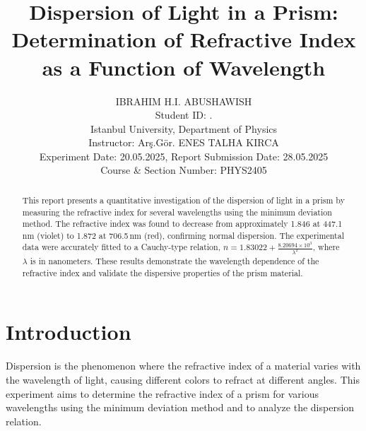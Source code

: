 \documentclass[journal]{IEEEtran}
\begin{document}
\title{Dispersion of Light in a Prism: Determination of Refractive Index as a Function of Wavelength}
\author{IBRAHIM H.I. ABUSHAWISH \\

{\small Student ID: \hspace{1.5cm}. \\ 
Istanbul University, Department of Physics \\
Instructor: Arş.Gör. ENES TALHA KIRCA\\
Experiment Date: 20.05.2025, Report Submission Date: 28.05.2025 \\
Course \& Section Number: PHYS2405}}


\maketitle
\begin{abstract}
    This report presents a quantitative investigation of the dispersion of light in a prism by measuring the refractive index for several wavelengths using the minimum deviation method. The refractive index was found to decrease from approximately 1.846 at 447.1\,nm (violet) to 1.872 at 706.5\,nm (red), confirming normal dispersion. The experimental data were accurately fitted to a Cauchy-type relation, \( n = 1.83022 + \frac{8.20694 \times 10^3}{\lambda^2} \), where \( \lambda \) is in nanometers. These results demonstrate the wavelength dependence of the refractive index and validate the dispersive properties of the prism material.
\end{abstract}

\section{Introduction}
Dispersion is the phenomenon where the refractive index of a material varies with the wavelength of light, causing different colors to refract at different angles. This experiment aims to determine the refractive index of a prism for various wavelengths using the minimum deviation method and to analyze the dispersion relation.
\end{document}
